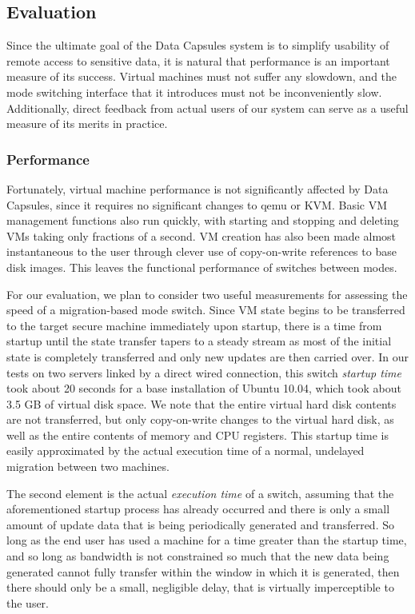 \documentclass{acm_proc_article-sp}
\begin{document}
\subsection{Evaluation}

Since the ultimate goal of the Data Capsules system is to simplify usability of
remote access to sensitive data, it is natural that performance is an important
measure of its success.  Virtual machines must not suffer any slowdown, and the
mode switching interface that it introduces must not be inconveniently slow.
Additionally, direct feedback from actual users of our system can serve as a
useful measure of its merits in practice.

\subsubsection{Performance}

Fortunately, virtual machine performance is not significantly affected by Data
Capsules, since it requires no significant changes to qemu or KVM.  Basic VM
management functions also run quickly, with starting and stopping and deleting
VMs taking only fractions of a second.  VM creation has also been made almost
instantaneous to the user through clever use of copy-on-write references to base
disk images.  This leaves the functional performance of switches between modes. 

For our evaluation, we plan to consider two useful measurements for assessing
the speed of a migration-based mode switch.  Since VM state begins to be
transferred to the target secure machine immediately upon startup, there is a
time from startup until the state transfer tapers to a steady stream as most of
the initial state is completely transferred and only new updates are then
carried over.  In our tests on two servers linked by a direct wired connection,
this switch \emph{startup time} took about 20 seconds for a base installation of
Ubuntu 10.04, which took about 3.5 GB of virtual disk space.  We note that the
entire virtual hard disk contents are not transferred, but only copy-on-write
changes to the virtual hard disk, as well as the entire contents of memory and
CPU registers.  This startup time is easily approximated by the actual execution
time of a normal, undelayed migration between two machines.

The second element is the actual \emph{execution time} of a switch, assuming
that the aforementioned startup process has already occurred and there is only a
small amount of update data that is being periodically generated and
transferred.  So long as the end user has used a machine for a time greater than
the startup time, and so long as bandwidth is not constrained so much that the
new data being generated cannot fully transfer within the window in which it is
generated, then there should only be a small, negligible delay, that is
virtually imperceptible to the user.
\end{document}
